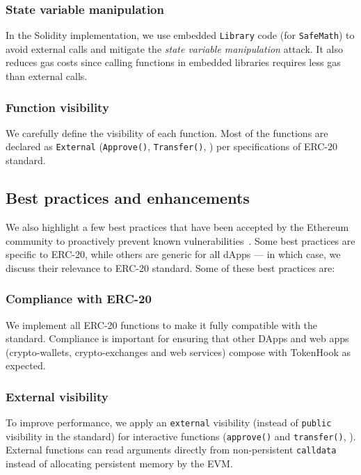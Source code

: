 \subsubsection{State variable manipulation} In the Solidity implementation, we use embedded \texttt{Library} code (for \texttt{SafeMath}) to avoid external calls and mitigate the \textit{state variable manipulation} attack. It also reduces gas costs since calling functions in embedded libraries requires less gas than external calls.

\subsubsection{Function visibility} We carefully define the visibility of each function. Most of the functions are declared as \texttt{External} (\eg \texttt{Approve()}, \texttt{Transfer()}, \etc) per specifications of ERC-20 standard.

\subsection{Best practices and enhancements}
We also highlight a few best practices that have been accepted by the Ethereum community to proactively prevent known vulnerabilities~\cite{TokenBP}. Some best practices are specific to ERC-20, while others are generic for all dApps --- in which case, we discuss their relevance to ERC-20 standard. Some of these best practices are:

\subsubsection{Compliance with ERC-20} We implement all ERC-20 functions to make it fully compatible with the standard. Compliance is important for ensuring that other DApps and web apps (\ie crypto-wallets, crypto-exchanges and web services) compose with TokenHook as expected. 

\subsubsection{External visibility} To improve performance, we apply an \texttt{external} visibility (instead of \texttt{public} visibility in the standard) for interactive functions (\eg \texttt{approve()} and \texttt{transfer()}, \etc).  External functions can read arguments directly from non-persistent \texttt{calldata} instead of allocating persistent memory by the EVM. 

